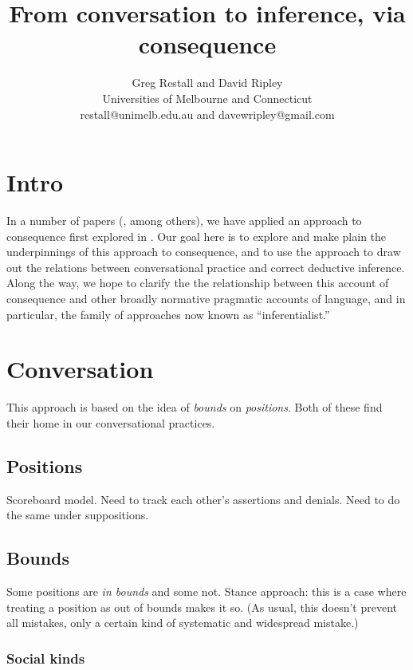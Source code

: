 \documentclass{article}
\title{From conversation to inference, via consequence}
\author{Greg Restall and David Ripley\\Universities of Melbourne and Connecticut\\restall@unimelb.edu.au and davewripley@gmail.com}
\begin{document}
\maketitle

\section{Intro}

In a number of papers (\cite{restall:tvpt, restall:cf2d, restall:adnct, ripley:pafc, ripley:bcw}, among others), we have applied an approach to consequence first explored in \cite{restall:mc}.
Our goal here is to explore and make plain the underpinnings of this approach to consequence, and to use the approach to draw out the relations between conversational practice and correct deductive inference. Along the way, we hope to clarify the the relationship between this account of consequence and other broadly normative pragmatic accounts of language, and in particular, the family of approaches now known as ``inferentialist.''

\section{Conversation}

This approach is based on the idea of {\em bounds} on {\em positions}.
Both of these find their home in our conversational practices.

\subsection{Positions}

Scoreboard model.
Need to track each other's assertions and denials.
Need to do the same under suppositions. 

\subsection{Bounds}

Some positions are {\em in bounds} and some not.
Stance approach: this is a case where treating a position as out of bounds makes it so.
(As usual, this doesn't prevent all mistakes, only a certain kind of systematic and widespread mistake.)

\subsubsection{Social kinds}
\end{document}

